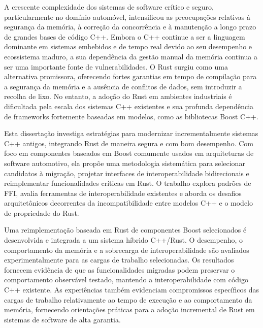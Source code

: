 \begin{abstractotherlanguage}
A crescente complexidade dos sistemas de software crítico e seguro, particularmente no domínio automóvel, 
intensificou as preocupações relativas à segurança da memória, à correção da concorrência 
e à manutenção a longo prazo de grandes bases de código C++. Embora o C++ continue a ser a linguagem dominante 
em sistemas embebidos e de tempo real devido ao seu desempenho e ecossistema maduro, 
a sua dependência da gestão manual da memória continua a ser uma importante fonte de vulnerabilidades. 
O Rust surgiu como uma alternativa promissora, oferecendo fortes garantias em tempo de compilação para a segurança da memória 
e a ausência de conflitos de dados, sem introduzir a recolha de lixo. 
No entanto, a adoção do Rust em ambientes industriais é dificultada pela escala dos sistemas C++ existentes 
e sua profunda dependência de frameworks fortemente baseadas em modelos, como as bibliotecas Boost C++.

Esta dissertação investiga estratégias para modernizar incrementalmente sistemas C++ antigos, integrando Rust de maneira segura 
e com bom desempenho. Com foco em componentes baseados em Boost comumente usados em arquiteturas de software automotivo, 
ela propõe uma metodologia sistemática para selecionar candidatos à migração, projetar interfaces de interoperabilidade 
bidirecionais e reimplementar funcionalidades críticas em Rust. O trabalho explora padrões de \gls{FFI}, 
avalia ferramentas de interoperabilidade existentes e aborda os desafios arquitetônicos decorrentes da incompatibilidade 
entre modelos C++ e o modelo de propriedade do Rust.

Uma reimplementação baseada em Rust de componentes Boost selecionados é desenvolvida e integrada a um sistema híbrido C++/Rust.
O desempenho, o comportamento da memória e a sobrecarga de interoperabilidade são avaliados experimentalmente para as cargas de trabalho selecionadas.
Os resultados fornecem evidência de que as funcionalidades migradas podem preservar o comportamento observável testado, mantendo a interoperabilidade
com código C++ existente. As experiências também evidenciam compromissos específicos das cargas de trabalho relativamente ao tempo de execução
e ao comportamento da memória, fornecendo orientações práticas para a adoção incremental de Rust em sistemas de software de alta garantia.

\end{abstractotherlanguage}



